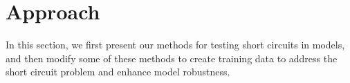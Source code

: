 \section{Approach}
% 
%
%
%
%
%
In this section, we first present our methods for testing short circuits in models, and then modify some of these methods to create training data to address the short circuit problem and enhance model robustness.

